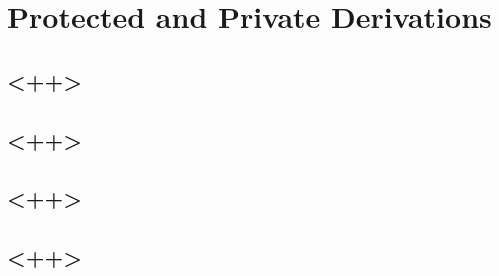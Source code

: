 \chapter{Protected and Private Derivations}

\section{<++>}

\section{<++>}

\section{<++>}

\section{<++>}

